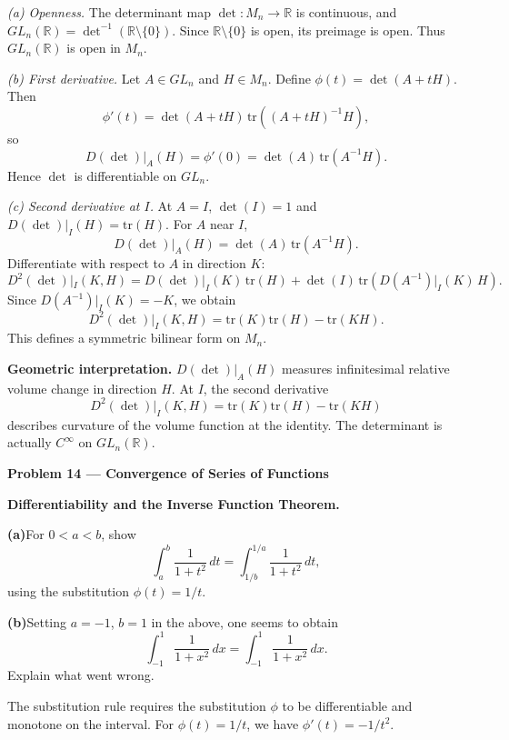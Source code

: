 \begin{solution}
\textit{(a) Openness.}
	The determinant map $\det:M_n\to\mathbb{R}$ is continuous,
	and $GL_n(\mathbb{R})=\det^{-1}(\mathbb{R}\setminus\{0\})$.
	Since $\mathbb{R}\setminus\{0\}$ is open, its preimage is open.
	Thus $GL_n(\mathbb{R})$ is open in $M_n$.

	\medskip

	\textit{(b) First derivative.}
	Let $A\in GL_n$ and $H\in M_n$.
	Define $\phi(t)=\det(A+tH)$.
	Then
	\[
	\phi'(t)=\det(A+tH)\,\mathrm{tr}((A+tH)^{-1}H),
	\]
	so
	\[
	D(\det)|_A(H)=\phi'(0)
	=\det(A)\,\mathrm{tr}(A^{-1}H).
	\]
	Hence $\det$ is differentiable on $GL_n$.

	\medskip

	\textit{(c) Second derivative at $I$.}
	At $A=I$, $\det(I)=1$ and $D(\det)|_I(H)=\mathrm{tr}(H)$.
	For $A$ near $I$,
	\[
	D(\det)|_A(H)=\det(A)\,\mathrm{tr}(A^{-1}H).
	\]
	Differentiate with respect to $A$ in direction $K$:
	\[
	D^2(\det)|_I(K,H)
	= D(\det)|_I(K)\,\mathrm{tr}(H)
	+ \det(I)\,\mathrm{tr}(D(A^{-1})|_I(K)\,H).
	\]
	Since $D(A^{-1})|_I(K)=-K$, we obtain
	\[
	D^2(\det)|_I(K,H)=\mathrm{tr}(K)\mathrm{tr}(H)-\mathrm{tr}(KH).
	\]
	This defines a symmetric bilinear form on $M_n$.


	\textbf{Geometric interpretation.}
	$D(\det)|_A(H)$ measures infinitesimal relative volume change in direction $H$.
	At $I$, the second derivative
	\[
	D^2(\det)|_I(K,H)=\mathrm{tr}(K)\mathrm{tr}(H)-\mathrm{tr}(KH)
	\]
	describes curvature of the volume function at the identity.
	The determinant is actually $C^\infty$ on $GL_n(\mathbb{R})$.

	\par\medskip\noindent\textbf{Problem 14 --- Convergence of Series of Functions}\par
\end{solution}

\begin{problem}[CP-II-0190]
\label{prob:cp-ii-0190}
\textbf{Differentiability and the Inverse Function Theorem.}

\par\smallskip\hspace*{1.5em}\textbf{(a)}\quad For $0<a<b$, show
	\[
	\int_a^b \frac{1}{1+t^2}\,dt=\int_{1/b}^{1/a}\frac{1}{1+t^2}\,dt,
	\]
	using the substitution $\phi(t)=1/t$.

	\par\smallskip\noindent\textbf{(b)}\quad Setting $a=-1$, $b=1$ in the above, one seems to obtain
	\[
	\int_{-1}^1 \frac{1}{1+x^2}\,dx=\int_{-1}^1 \frac{1}{1+x^2}\,dx.
	\]
	Explain what went wrong.

The substitution rule requires the substitution $\phi$ to be differentiable and monotone on the interval. For $\phi(t)=1/t$, we have $\phi'(t)=-1/t^2$.
\end{problem}

